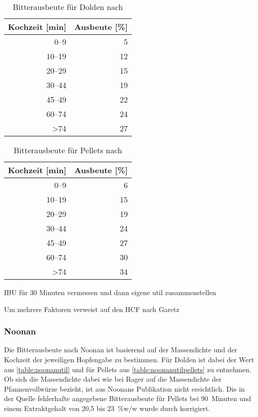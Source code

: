 \documentclass[a4paper,parskip=half]{scrartcl}
\begin{document}
\begin{table}[H]
\centering
\begin{tabular}{rr}
\toprule
\multicolumn{1}{c}{\textbf{Kochzeit [min]}} & \multicolumn{1}{c}{\textbf{Ausbeute [\%]}} \\
\midrule
0–9            & 5  \\
10–19          & 12 \\
20–29          & 15 \\
30–44          & 19 \\
45–49          & 22 \\
60–74          & 24 \\
>74            & 27 \\
\bottomrule
\end{tabular}
\caption{Bitterausbeute für Dolden nach \citeauthor{Daniels1996} \parencite[80]{Daniels1996}}
\label{table:danielsutil}
\end{table}

\begin{table}[H]
\centering
\begin{tabular}{rr}
\toprule
\multicolumn{1}{c}{\textbf{Kochzeit [min]}} & \multicolumn{1}{c}{\textbf{Ausbeute [\%]}} \\
\midrule
0–9            & 6 \\
10–19          & 15 \\
20–29          & 19 \\
30–44          & 24 \\
45–49          & 27 \\
60–74          & 30 \\
>74            & 34 \\
\bottomrule
\end{tabular}
\caption{Bitterausbeute für Pellets nach \citeauthor{Daniels1996} \parencite[80]{Daniels1996}}
\label{table:danielsutilpellets}
\end{table}

\parencite[85]{Daniels1996}
IBU für 30 Minuten vermessen und dann eigene util zusammenstellen

\parencite[86]{Daniels1996}
Um mehrere Faktoren verweist auf den HCF nach Garetz

\subsubsection*{Noonan}

Die Bitterausbeute nach Noonan ist basierend auf der Massendichte und
der Kochzeit der jeweiligen Hopfengabe zu bestimmen. Für Dolden ist
dabei der Wert aus \autoref{table:noonanutil} und für Pellets aus
\autoref{table:noonanutilpellets} zu entnehmen. Ob sich die
Massendichte dabei wie bei Rager auf die Massendichte der Pfannenvollwürze
bezieht, ist aus Noonans Publikation nicht ersichtlich. Die in der Quelle
fehlerhafte angegebene Bitterausbeute für Pellets bei 90~Minuten und
einem Extraktgehalt von 20,5 bis 23~\%w/w wurde durch korrigiert.
\end{document}
